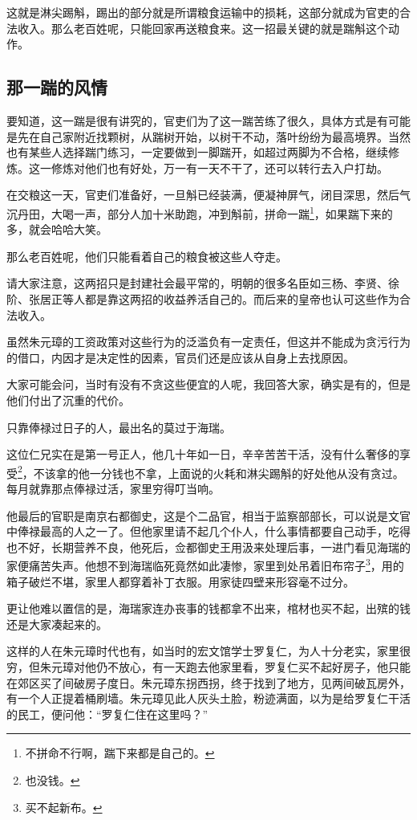 \begin{multicols}{\theparacolNo}
		这就是淋尖踢斛，踢出的部分就是所谓粮食运输中的损耗，这部分就成为官吏的合法收入。那么老百姓呢，只能回家再送粮食来。这一招最关键的就是踹斛这个动作。

		\subsection{那一踹的风情}
		要知道，这一踹是很有讲究的，官吏们为了这一踹苦练了很久，具体方式是有可能是先在自己家附近找颗树，从踹树开始，以树干不动，落叶纷纷为最高境界。当然也有某些人选择踹门练习，一定要做到一脚踹开，如超过两脚为不合格，继续修炼。这一修炼对他们也有好处，万一有一天不干了，还可以转行去入户打劫。

		在交粮这一天，官吏们准备好，一旦斛已经装满，便凝神屏气，闭目深思，然后气沉丹田，大喝一声，部分人加十米助跑，冲到斛前，拼命一踹\footnote{不拼命不行啊，踹下来都是自己的。}，如果踹下来的多，就会哈哈大笑。

		那么老百姓呢，他们只能看着自己的粮食被这些人夺走。

		请大家注意，这两招只是封建社会最平常的，明朝的很多名臣如三杨、李贤、徐阶、张居正等人都是靠这两招的收益养活自己的。而后来的皇帝也认可这些作为合法收入。

		虽然朱元璋的工资政策对这些行为的泛滥负有一定责任，但这并不能成为贪污行为的借口，内因才是决定性的因素，官员们还是应该从自身上去找原因。

		大家可能会问，当时有没有不贪这些便宜的人呢，我回答大家，确实是有的，但是他们付出了沉重的代价。

		只靠俸禄过日子的人，最出名的莫过于海瑞。

		这位仁兄实在是第一号正人，他几十年如一日，辛辛苦苦干活，没有什么奢侈的享受\footnote{也没钱。}，不该拿的他一分钱也不拿，上面说的火耗和淋尖踢斛的好处他从没有贪过。每月就靠那点俸禄过活，家里穷得叮当响。

		他最后的官职是南京右都御史，这是个二品官，相当于监察部部长，可以说是文官中俸禄最高的人之一了。但他家里请不起几个仆人，什么事情都要自己动手，吃得也不好，长期营养不良，他死后，佥都御史王用汲来处理后事，一进门看见海瑞的家便痛苦失声。他想不到海瑞临死竟然如此凄惨，家里到处吊着旧布帘子\footnote{买不起新布。}，用的箱子破烂不堪，家里人都穿着补丁衣服。用家徒四壁来形容毫不过分。

		更让他难以置信的是，海瑞家连办丧事的钱都拿不出来，棺材也买不起，出殡的钱还是大家凑起来的。

		这样的人在朱元璋时代也有，如当时的宏文馆学士罗复仁，为人十分老实，家里很穷，但朱元璋对他仍不放心，有一天跑去他家里看，罗复仁买不起好房子，他只能在郊区买了间破房子度日。朱元璋东拐西拐，终于找到了地方，见两间破瓦房外，有一个人正提着桶刷墙。朱元璋见此人灰头土脸，粉迹满面，以为是给罗复仁干活的民工，便问他：“罗复仁住在这里吗？”


\end{multicols}
